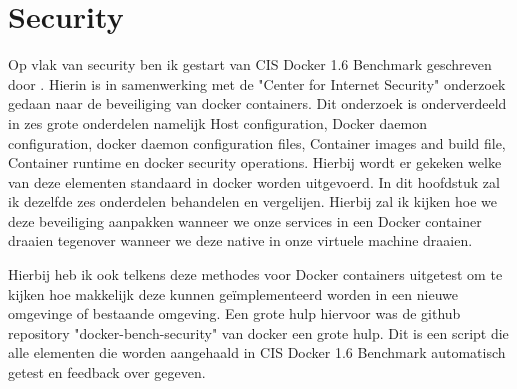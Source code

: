 \chapter{Security}

Op vlak van security ben ik gestart van CIS Docker 1.6 Benchmark geschreven door \cite{PravinGoyal2015}. Hierin is in samenwerking met de "Center for Internet Security" onderzoek gedaan naar de beveiliging van docker containers. Dit onderzoek is onderverdeeld in zes grote onderdelen namelijk Host configuration, Docker daemon configuration, docker daemon configuration files, Container images and build file, Container runtime en docker security operations. Hierbij wordt er gekeken welke van deze elementen standaard in docker worden uitgevoerd. In dit hoofdstuk zal ik dezelfde zes onderdelen behandelen en vergelijen. Hierbij zal ik kijken hoe we deze beveiliging aanpakken wanneer we onze services in een Docker container draaien tegenover wanneer we deze native in onze virtuele machine draaien.


Hierbij heb ik ook telkens deze methodes voor Docker containers uitgetest om te kijken hoe makkelijk deze kunnen geïmplementeerd worden in een nieuwe omgevinge of bestaande omgeving. Een grote hulp hiervoor was de github repository "docker-bench-security" van docker een grote hulp. Dit is een script die alle elementen die worden aangehaald in CIS Docker 1.6 Benchmark automatisch getest en feedback over gegeven.




